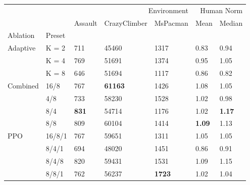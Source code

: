 \begin{tabular}{lllllll}
\toprule
 &  & \multicolumn{3}{r}{Environment} & \multicolumn{2}{r}{Human Norm} \\
 &  & Assault & CrazyClimber & MsPacman & Mean & Median \\
Ablation & Preset &  &  &  &  &  \\
\midrule
\multirow[t]{3}{*}{Adaptive} & K = 2 & 711 & 45460 & 1317 & 0.83 & 0.94 \\
 & K = 4 & 769 & 51691 & 1374 & 0.95 & 1.05 \\
 & K = 8 & 646 & 51694 & 1117 & 0.86 & 0.82 \\
\cline{1-7}
\multirow[t]{4}{*}{Combined} & 16/8 & 767 & {\bf 61163} & 1426 & 1.08 & 1.05 \\
 & 4/8 & 733 & 58230 & 1528 & 1.02 & 0.98 \\
 & 8/4 & {\bf 831} & 54714 & 1176 & 1.02 & {\bf 1.17} \\
 & 8/8 & 809 & 60104 & 1414 & {\bf 1.09} & 1.13 \\
\cline{1-7}
\multirow[t]{4}{*}{PPO} & 16/8/1 & 767 & 59651 & 1311 & 1.05 & 1.05 \\
 & 8/4/1 & 694 & 48020 & 1451 & 0.86 & 0.91 \\
 & 8/4/8 & 820 & 59431 & 1531 & 1.09 & 1.15 \\
 & 8/8/1 & 762 & 56237 & {\bf 1723} & 1.02 & 1.04 \\
\cline{1-7}
\bottomrule
\end{tabular}
